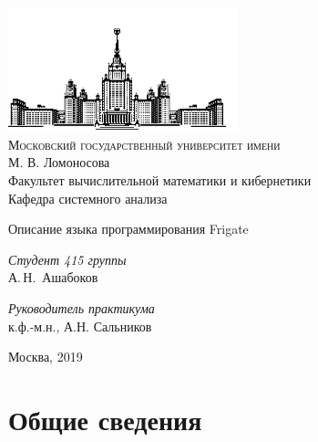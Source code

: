 \documentclass[a4paper, 12pt]{article}
\begin{document}
\thispagestyle{empty}
\lstset{language=C++}

\begin{center}
\vspace{-3cm}
\includegraphics[width=0.5\textwidth]{msu.png}\\
{\scshape Московский государственный университет имени}\\
М. В. Ломоносова\\
Факультет вычислительной математики и кибернетики\\
Кафедра системного анализа

\vfill


\vspace{1cm}

{\LARGE Описание языка программирования Frigate}
\end{center}

\vspace{1cm}

\begin{flushright}
  \large
  \textit{Студент 415 группы}\\
  А.\,Н.~Ашабоков

  \vspace{5mm}

  \textit{Руководитель практикума}\\
  к.ф.-м.н., А.Н. Сальников 
\end{flushright}

\vfill

\begin{center}
Москва, 2019
\end{center}

\newpage
\setcounter{tocdepth}{1}
\tableofcontents

\newpage
\normalsize

\section{Общие сведения}
\end{document}
